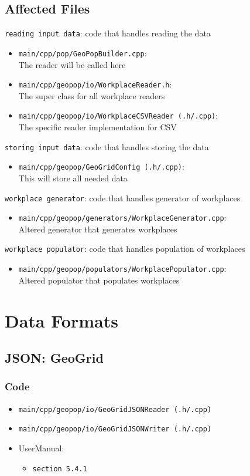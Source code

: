 \documentclass[runningheads]{llncs}
\begin{document}
	\subsection{Affected Files}
		\texttt{reading input data}: code that handles reading the data
		\begin{itemize}
			\item \texttt{main/cpp/pop/GeoPopBuilder.cpp}: \\ The reader will be called here
			\item \texttt{main/cpp/geopop/io/WorkplaceReader.h}: \\
			The super class for all workplace readers
			\item \texttt{main/cpp/geopop/io/WorkplaceCSVReader (.h/.cpp)}: \\
			The specific reader implementation for CSV
		\end{itemize}
		\texttt{storing input data}: code that handles storing the data
		\begin{itemize}
			\item \texttt{main/cpp/geopop/GeoGridConfig (.h/.cpp)}: \\
			This will store all needed data
		\end{itemize}
		\texttt{workplace generator}: code that handles generator of workplaces
		\begin{itemize}
			\item \texttt{main/cpp/geopop/generators/WorkplaceGenerator.cpp}:\\
			Altered generator that generates workplaces
		\end{itemize}
		\texttt{workplace populator}: code that handles population of workplaces
		\begin{itemize}
			\item \texttt{main/cpp/geopop/populators/WorkplacePopulator.cpp}:\\
			Altered populator that populates workplaces
		\end{itemize}
	
	\section{Data Formats}
	
	\subsection{JSON: GeoGrid}
	
	\subsubsection{Code}
	\begin{itemize}
		\item \texttt{main/cpp/geopop/io/GeoGridJSONReader (.h/.cpp)}
		\item \texttt{main/cpp/geopop/io/GeoGridJSONWriter (.h/.cpp)}
		\item UserManual:
			\begin{itemize}
				\item \texttt{section 5.4.1}
			\end{itemize}
	\end{itemize}
	
\end{document}
